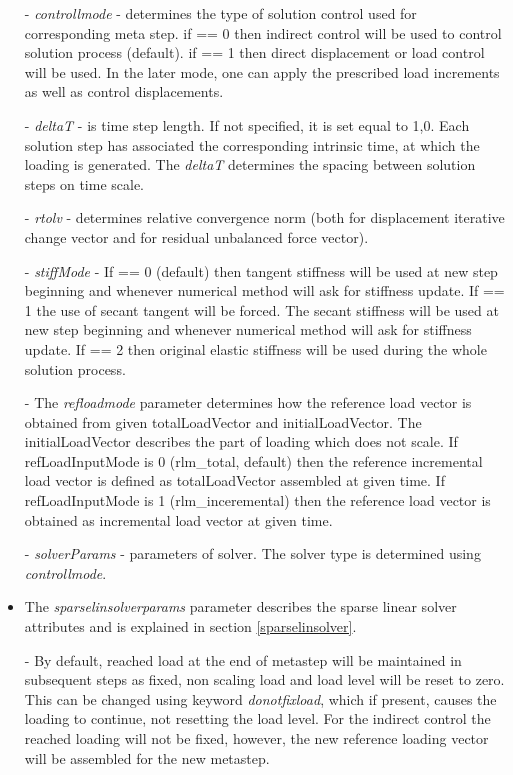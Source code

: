 \documentclass[draft]{article}
\newcommand{\param}[1]{{\em #1}}
\begin{document}
\begin{itemize}
\item[-] \param{controllmode} - determines the type of solution
control used for corresponding meta step. if == 0 then indirect
control will be used to control solution process (default). if == 1
then direct displacement or load control will be used. In the later
mode, one can apply the prescribed load increments as well as
control displacements.
\item[-] \param{deltaT} - is time step length. If not specified, it is
set equal to 1,0. Each solution step has associated the corresponding
intrinsic time, at which the loading is generated. The \param{deltaT}
determines the spacing between solution steps on time scale. 
\item[-] \param{rtolv} - determines relative convergence norm (both for displacement
iterative change vector and for residual unbalanced force vector).
\item[-] \param{stiffMode} - If == 0 (default) then tangent stiffness will be used
at new step beginning and whenever numerical method will ask for
stiffness update. If == 1 the use of secant tangent will be forced. 
The secant stiffness will be used at new step beginning 
and whenever numerical method will ask for stiffness update.
If == 2 then original elastic stiffness will
be used during the whole solution process.
\item[-] The \param{refloadmode} parameter determines how the reference load vector 
is obtained from given totalLoadVector and initialLoadVector.
The initialLoadVector describes the part of loading which does not scale.
If refLoadInputMode is 0 (rlm\_total, default) then the reference incremental load vector is defined as
totalLoadVector assembled at given time.
If refLoadInputMode is 1 (rlm\_inceremental) then the reference load vector is
obtained as incremental load vector at given time.
\item[-] \param{solverParams} - parameters of solver. The solver type
is determined using \param{controllmode}.
\item The  \param{sparselinsolverparams} parameter describes the sparse
linear solver attributes and is explained in section
\ref{sparselinsolver}.
\item[-] By default, reached load at the end of
metastep will be maintained in subsequent steps as fixed, non scaling
load and load level will be reset to zero. This can be changed using keyword \param{donotfixload}, which if
present, causes the loading to continue, not resetting the load
level. For the indirect control the reached loading will not be
fixed, however, the new reference loading vector will be assembled for
the new metastep. 
\end{itemize}
\end{document}
